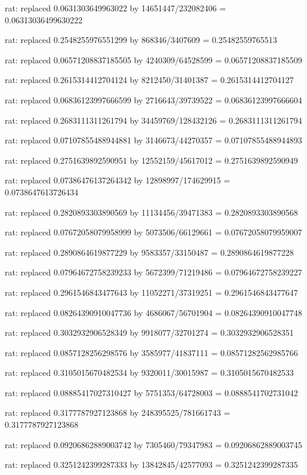 \documentclass[a4paper,10pt]{article}
\begin{document}
\begin{eulernotebook}
\begin{eulercomment}
\begin{eulercomment}
\begin{eulercomment}
\begin{eulercomment}
\begin{eulercomment}
\begin{eulercomment}
\begin{eulercomment}
\begin{eulercomment}
\begin{eulercomment}
\begin{eulercomment}
\begin{eulercomment}
\begin{eulercomment}
\begin{eulercomment}
\begin{eulercomment}
\begin{eulercomment}
\begin{eulercomment}
\begin{euleroutput}
  rat: replaced 0.0631303649963022 by 14651447/232082406 = 0.06313036499630222
  
  rat: replaced 0.2548255976551299 by 868346/3407609 = 0.25482559765513
  
  rat: replaced 0.06571208837185505 by 4240309/64528599 = 0.06571208837185509
  
  rat: replaced 0.2615314412704124 by 8212450/31401387 = 0.2615314412704127
  
  rat: replaced 0.06836123997666599 by 2716643/39739522 = 0.06836123997666604
  
  rat: replaced 0.2683111311261794 by 34459769/128432126 = 0.2683111311261794
  
  rat: replaced 0.07107855488944881 by 3146673/44270357 = 0.07107855488944893
  
  rat: replaced 0.2751639892590951 by 12552159/45617012 = 0.2751639892590949
  
  rat: replaced 0.07386476137264342 by 12898997/174629915 = 0.0738647613726434
  
  rat: replaced 0.2820893303890569 by 11134456/39471383 = 0.2820893303890568
  
  rat: replaced 0.07672058079958999 by 5073506/66129661 = 0.07672058079959007
  
  rat: replaced 0.2890864619877229 by 9583357/33150487 = 0.2890864619877228
  
  rat: replaced 0.07964672758239233 by 5672399/71219486 = 0.07964672758239227
  
  rat: replaced 0.2961546843477643 by 11052271/37319251 = 0.2961546843477647
  
  rat: replaced 0.08264390910047736 by 4686067/56701904 = 0.08264390910047748
  
  rat: replaced 0.3032932906528349 by 9918077/32701274 = 0.3032932906528351
  
  rat: replaced 0.0857128256298576 by 3585977/41837111 = 0.08571282562985766
  
  rat: replaced 0.3105015670482534 by 9320011/30015987 = 0.3105015670482533
  
  rat: replaced 0.08885417027310427 by 5751353/64728003 = 0.0888541702731042
  
  rat: replaced 0.3177787927123868 by 248395525/781661743 = 0.3177787927123868
  
  rat: replaced 0.09206862889003742 by 7305460/79347983 = 0.09206862889003745
  
  rat: replaced 0.3251242399287333 by 13842845/42577093 = 0.3251242399287335
  

\end{euleroutput}
\end{eulercomment}
\end{eulercomment}
\end{eulercomment}
\end{eulercomment}
\end{eulercomment}
\end{eulercomment}
\end{eulercomment}
\end{eulercomment}
\end{eulercomment}
\end{eulercomment}
\end{eulercomment}
\end{eulercomment}
\end{eulercomment}
\end{eulercomment}
\end{eulercomment}
\end{eulercomment}
\end{eulernotebook}
\end{document}
